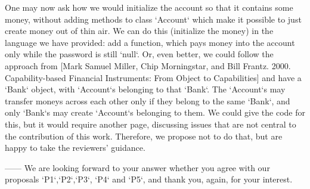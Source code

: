 One may now ask how we would initialize the account so that it contains some money, 
without adding methods to class `Account` which make it possible to just create money
out of thin air. We can do this (initialize the money) in the language we have
provided: add a function, which pays money into the account only while the password 
is still `null`. Or, even better, we could follow the approach  from [Mark Samuel Miller, 
Chip Morningstar, and Bill Frantz. 2000. Capability-based Financial Instruments: 
From Object to Capabilities] and have a `Bank` object, with `Account`s belonging 
to that `Bank`. The `Account`s may transfer moneys across 
each other only if they belong to the same `Bank`, and only `Bank`s may create `Account`s 
belonging to them. We could give the code for this, but it would require another page, 
discussing issues that are not central to the contribution of this work. Therefore,
we propose not to do that, but are happy to take the reviewers' guidance.

------
We are looking forward to your answer whether you agree with our proposals `P1`,`P2`,`P3`, `P4` and `P5`, and thank you, again, for your interest.
 
